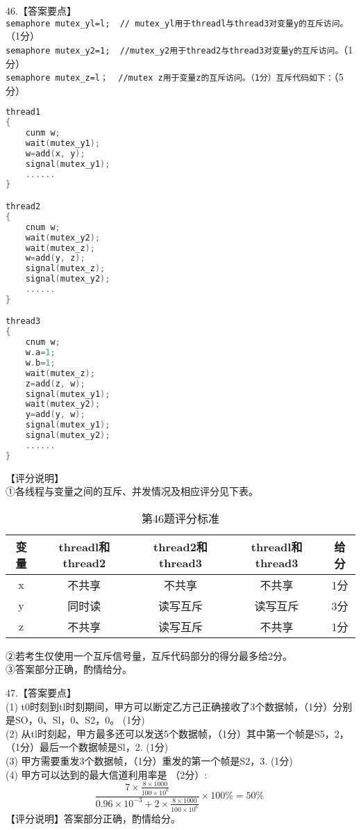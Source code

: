46.【答案要点】 \\
\verb|semaphore mutex_yl=l;  // mutex_yl用于threadl与thread3对变量y的互斥访问。|（1分） \\
\verb|semaphore mutex_y2=1;  //mutex_y2用于thread2与thread3对变量y的互斥访问。|（1分） \\
\verb|semaphore mutex_z=l；  //mutex z用于变量z的互斥访问。（1分）互斥代码如下：|（5分） \\
\begin{lstlisting}[language=cpp]
thread1
{
    cunm w;
    wait(mutex_y1);
    w=add(x, y);
    signal(mutex_y1);
    ......
}

thread2
{
    cnum w;
    wait(mutex_y2);
    wait(mutex_z);
    w=add(y, z);
    signal(mutex_z);
    signal(mutex_y2);
    ......
}

thread3
{
    cnum w;
    w.a=1;
    w.b=1;
    wait(mutex_z);
    z=add(z, w);
    signal(mutex_y1);
    wait(mutex_y2);
    y=add(y, w);
    signal(mutex_y1);
    signal(mutex_y2);
    ......
}
\end{lstlisting}
【评分说明】 \\
①各线程与变量之间的互斥、并发情况及相应评分见下表。
\begin{table}[ht]
\centering
\caption{第46题评分标准}\label{tab_CSN17_4}
\begin{tabular}{|c|c|c|c|c|}
\hline
变量 & threadl和thread2 & thread2和thread3 & threadl和thread3 & 给分 \\
\hline
x & 不共享 & 不共享 & 不共享 & 1分 \\
\hline
y & 同时读 & 读写互斥 & 读写互斥 & 3分 \\
\hline
z & 不共享 & 读写互斥 & 不共享 & 1分 \\
\hline
\end{tabular}
\end{table}
②若考生仅使用一个互斥信号量，互斥代码部分的得分最多给2分。 \\
③答案部分正确，酌情给分。

47.【答案要点】 \\
(1) t0时刻到tl时刻期间，甲方可以断定乙方己正确接收了3个数据帧，（1分）分别是SO，0、Sl，0、S2，0。 (1分) \\
(2) 从tl时刻起，甲方最多还可以发送5个数据帧，（1分）其中第一个帧是S5，2，（1分）最后一个数据帧是Sl，2. (1分) \\
(3) 甲方需要重发3个数据帧，（1分）重发的第一个帧是S2，3. (1分) \\
(4) 甲方可以达到的最大信道利用率是 （2分）: \\
\begin{equation}
\frac{7 \times \frac{8\times1000}{100\times10^6}}{0.96\times10^{-3}+2\times\frac{8\times1000}{100\times10^6}}\times100\%=50\%~
\end{equation}
【评分说明】答案部分正确，酌情给分。
